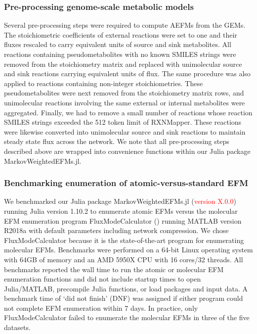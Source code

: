 \documentclass[12pt]{article}
\begin{document}
\subsubsection*{Pre-processing genome-scale metabolic models}

Several pre-processing steps were required to compute AEFMs from the GEMs.
The stoichiometric coefficients of external reactions were set to one and
their fluxes rescaled to carry equivalent units of source and sink
metabolites. All reactions containing pseudometabolites with no known
SMILES strings were removed from the stoichiometry matrix and replaced
with unimolecular source and sink reactions carrying equivalent units of
flux. The same procedure was also applied to reactions containing
non-integer stoichiometries. These pseudometabolites were next removed
from the stoichiometry matrix rows, and unimolecular reactions involving
the same external or internal metabolites were aggregated. Finally, we had
to remove a small number of reactions whose reaction SMILES strings
exceeded the 512 token limit of RXNMapper. These reactions were likewise
converted into unimolecular source and sink reactions to maintain steady
state flux across the network. We note that all pre-processing steps
described above are wrapped into convenience functions within our Julia
package MarkovWeightedEFMs.jl.

\subsubsection*{Benchmarking enumeration of atomic-versus-standard EFM}

We benchmarked our Julia package MarkovWeightedEFMs.jl
(\textcolor{red}{version X.0.0}) running Julia version 1.10.2 to enumerate
atomic EFMs versus the molecular EFM enumeration program
FluxModeCalculator (\cite{vanKlinkenJanBert2016Faet}) running MATLAB
version R2018a with default parameters including network compression. We
chose FluxModeCalculator because it is the state-of-the-art program for
enumerating molecular EFMs. Benchmarks were performed on a 64-bit Linux
operating system with 64GB of memory and an AMD 5950X CPU with 16 cores/32
threads. All benchmarks reported the wall time to run the atomic or
molecular EFM enumeration functions and did not include startup times to
open Julia/MATLAB, precompile Julia functions, or load packages and input
data. A benchmark time of `did not finish' (DNF) was assigned if either
program could not complete EFM enumeration within 7 days. In practice,
only FluxModeCalculator failed to enumerate the molecular EFMs in three of
the five datasets.
   
\end{document}
